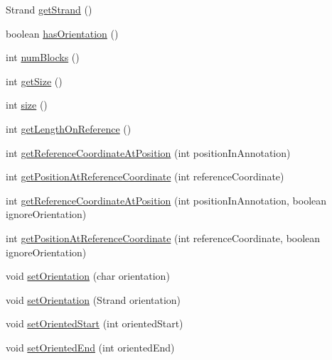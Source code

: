 \begin{DoxyCompactItemize}
\item 
Strand \hyperlink{classbroad_1_1core_1_1sequence_1_1_sequence_region_a59d6c478e423d1b674f4a650409cb4c1}{get\+Strand} ()
\item 
boolean \hyperlink{classbroad_1_1core_1_1sequence_1_1_sequence_region_ae5513dbaa852b991aea00b3d9188ee63}{has\+Orientation} ()
\item 
int \hyperlink{classbroad_1_1core_1_1sequence_1_1_sequence_region_ad1b580d1dacc07c38a8044200f383ef1}{num\+Blocks} ()
\item 
int \hyperlink{classbroad_1_1core_1_1sequence_1_1_sequence_region_a2688217ce17cf4cdfc30c746380db0f8}{get\+Size} ()
\item 
int \hyperlink{classbroad_1_1core_1_1sequence_1_1_sequence_region_aa3ee74c7111be122e85a67df4fc44acb}{size} ()
\item 
int \hyperlink{classbroad_1_1core_1_1sequence_1_1_sequence_region_a1f19800e926c265f58ad05065bdc9a88}{get\+Length\+On\+Reference} ()
\item 
int \hyperlink{classbroad_1_1core_1_1sequence_1_1_sequence_region_ab9b50765cf5cf7dfa8d123379e9d1a4d}{get\+Reference\+Coordinate\+At\+Position} (int position\+In\+Annotation)
\item 
int \hyperlink{classbroad_1_1core_1_1sequence_1_1_sequence_region_a814cf3f63d0af28f322e31ada59fc208}{get\+Position\+At\+Reference\+Coordinate} (int reference\+Coordinate)
\item 
int \hyperlink{classbroad_1_1core_1_1sequence_1_1_sequence_region_a7fced373c02877b366667388203c64f9}{get\+Reference\+Coordinate\+At\+Position} (int position\+In\+Annotation, boolean ignore\+Orientation)
\item 
int \hyperlink{classbroad_1_1core_1_1sequence_1_1_sequence_region_a0f36852c5cfa5a41e7e188cd37e527e8}{get\+Position\+At\+Reference\+Coordinate} (int reference\+Coordinate, boolean ignore\+Orientation)
\item 
void \hyperlink{classbroad_1_1core_1_1sequence_1_1_sequence_region_a7edb4a4466f61c264f020e3b60e4a4f8}{set\+Orientation} (char orientation)
\item 
void \hyperlink{classbroad_1_1core_1_1sequence_1_1_sequence_region_a3e30de43e19eef4c7a576086195ddbb8}{set\+Orientation} (Strand orientation)
\item 
void \hyperlink{classbroad_1_1core_1_1sequence_1_1_sequence_region_ab41d0116c937d9875131e50013a42a4c}{set\+Oriented\+Start} (int oriented\+Start)
\item 
void \hyperlink{classbroad_1_1core_1_1sequence_1_1_sequence_region_a64c04998f8049912cd03687edb2c4012}{set\+Oriented\+End} (int oriented\+End)

\end{DoxyCompactItemize}
